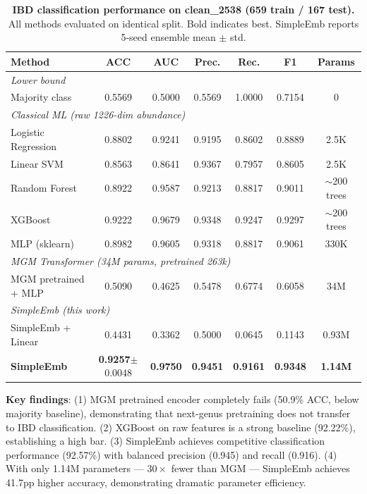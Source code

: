 \documentclass[11pt,a4paper]{article}
\begin{document}
\begin{table}[ht]
\centering
\caption{\textbf{IBD classification performance on clean\_2538 (659 train / 167 test).}
All methods evaluated on identical split. Bold indicates best. SimpleEmb reports 5-seed ensemble mean $\pm$ std.}
\label{tab:baselines}
\begin{tabular}{lcccccc}
\toprule
\textbf{Method} & \textbf{ACC} & \textbf{AUC} & \textbf{Prec.} & \textbf{Rec.} & \textbf{F1} & \textbf{Params} \\
\midrule
\multicolumn{7}{l}{\textit{Lower bound}} \\
\;\; Majority class & 0.5569 & 0.5000 & 0.5569 & 1.0000 & 0.7154 & 0 \\
\midrule
\multicolumn{7}{l}{\textit{Classical ML (raw 1226-dim abundance)}} \\
\;\; Logistic Regression & 0.8802 & 0.9241 & 0.9195 & 0.8602 & 0.8889 & 2.5K \\
\;\; Linear SVM & 0.8563 & 0.8641 & 0.9367 & 0.7957 & 0.8605 & 2.5K \\
\;\; Random Forest & 0.8922 & 0.9587 & 0.9213 & 0.8817 & 0.9011 & $\sim$200 trees \\
\;\; XGBoost & 0.9222 & 0.9679 & 0.9348 & 0.9247 & 0.9297 & $\sim$200 trees \\
\;\; MLP (sklearn) & 0.8982 & 0.9605 & 0.9318 & 0.8817 & 0.9061 & 330K \\
\midrule
\multicolumn{7}{l}{\textit{MGM Transformer (34M params, pretrained 263k)}} \\
\;\; MGM pretrained + MLP & 0.5090 & 0.4625 & 0.5478 & 0.6774 & 0.6058 & 34M \\
\midrule
\multicolumn{7}{l}{\textit{SimpleEmb (this work)}} \\
\;\; SimpleEmb + Linear & 0.4431 & 0.3362 & 0.5000 & 0.0645 & 0.1143 & 0.93M \\
\;\; \textbf{SimpleEmb} & \textbf{0.9257}$\pm$0.0048 & \textbf{0.9750} & \textbf{0.9451} & \textbf{0.9161} & \textbf{0.9348} & \textbf{1.14M} \\
\bottomrule
\end{tabular}
\end{table}

\textbf{Key findings}: (1) MGM pretrained encoder completely fails (50.9\% ACC, below majority baseline), demonstrating that next-genus pretraining does not transfer to IBD classification. (2) XGBoost on raw features is a strong baseline (92.22\%), establishing a high bar. (3) SimpleEmb achieves competitive classification performance (92.57\%) with balanced precision (0.945) and recall (0.916). (4) With only 1.14M parameters --- $30\times$ fewer than MGM --- SimpleEmb achieves 41.7pp higher accuracy, demonstrating dramatic parameter efficiency.
\end{document}
